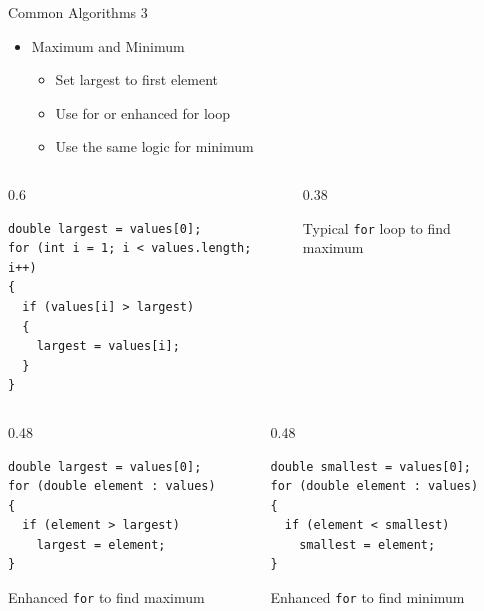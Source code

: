\documentclass[aspectratio=43,10pt,t]{beamer}
\newcommand{\code}[1]{\texttt{#1}}
\newcommand{\callout}[2][\linewidth]{%
  {\setlength{\fboxsep}{3pt}\colorbox{callout}{%
    \parbox{\dimexpr#1-6pt\relax}{\raggedright\footnotesize #2}}}}
\begin{document}
\begin{frame}[fragile]{Common Algorithms 3}
  \begin{itemize}
    \item Maximum and Minimum
      \begin{itemize}
        \item Set largest to first element
        \item Use for or enhanced for loop
        \item Use the same logic for minimum
      \end{itemize}
  \end{itemize}
  \begin{columns}[c]
    \begin{column}{0.6\textwidth}
\begin{lstlisting}
double largest = values[0];
for (int i = 1; i < values.length; i++)
{
  if (values[i] > largest)
  {
    largest = values[i];
  }
}
\end{lstlisting}
    \end{column}
    \begin{column}{0.38\textwidth}
      \callout{Typical \code{for} loop to find maximum}
    \end{column}
  \end{columns}
  \begin{columns}[T]
    \begin{column}{0.48\textwidth}
\begin{lstlisting}
double largest = values[0];
for (double element : values)
{
  if (element > largest)
    largest = element;
}
\end{lstlisting}
      \callout{Enhanced \code{for} to find maximum}
    \end{column}
    \begin{column}{0.48\textwidth}
\begin{lstlisting}
double smallest = values[0];
for (double element : values)
{
  if (element < smallest)
    smallest = element;
}
\end{lstlisting}
      \callout{Enhanced \code{for} to find minimum}
    \end{column}
  \end{columns}
\end{frame}
\end{document}
